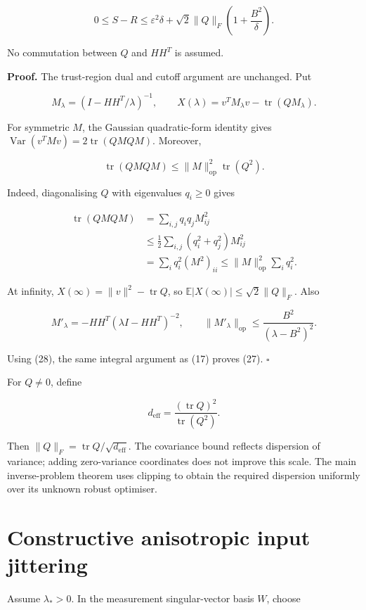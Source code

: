 \documentclass[11pt,a4paper]{article}
\begin{document}
\[
0\le S-R\le\varepsilon^2\delta+
\sqrt2\|Q\|_F\left(1+\frac{B^2}{\delta}\right).
\tag{27}
\]

No commutation between \(Q\) and \(HH^T\) is assumed.

\textbf{Proof.} The trust-region dual and cutoff argument are unchanged.
Put

\[
M_\lambda=(I-HH^T/\lambda)^{-1},\qquad
X(\lambda)=v^TM_\lambda v-\operatorname{tr}(QM_\lambda).
\]

For symmetric \(M\), the Gaussian quadratic-form identity gives
\(\operatorname{Var}(v^TMv)=2\operatorname{tr}(QMQM)\). Moreover,

\[
\operatorname{tr}(QMQM)\le\|M\|_{\mathrm{op}}^2\operatorname{tr}(Q^2).
\tag{28}
\]

Indeed, diagonalising \(Q\) with eigenvalues \(q_i\ge0\) gives

\[
\begin{aligned}
\operatorname{tr}(QMQM)
&=\sum_{i,j}q_iq_jM_{ij}^2\\
&\le\frac12\sum_{i,j}(q_i^2+q_j^2)M_{ij}^2\\
&=\sum_iq_i^2(M^2)_{ii}
\le\|M\|_{\mathrm{op}}^2\sum_iq_i^2.
\end{aligned}
\]

At infinity, \(X(\infty)=\|v\|^2-\operatorname{tr}Q\), so
\(\mathbb E|X(\infty)|\le\sqrt2\|Q\|_F\). Also

\[
M'_\lambda=-HH^T(\lambda I-HH^T)^{-2},\qquad
\|M'_\lambda\|_{\mathrm{op}}
\le\frac{B^2}{(\lambda-B^2)^2}.
\]

Using (28), the same integral argument as (17) proves (27). \(\square\)

For \(Q\ne0\), define

\[
d_{\mathrm{eff}}=\frac{(\operatorname{tr}Q)^2}{\operatorname{tr}(Q^2)}.
\]

Then \(\|Q\|_F=\operatorname{tr}Q/\sqrt{d_{\mathrm{eff}}}\). The
covariance bound reflects dispersion of variance; adding zero-variance
coordinates does not improve this scale. The main inverse-problem
theorem uses clipping to obtain the required dispersion uniformly over
its unknown robust optimiser.

\hypertarget{constructive-anisotropic-input-jittering}{%
\section{Constructive anisotropic input
jittering}\label{constructive-anisotropic-input-jittering}}

Assume \(\lambda_*>0\). In the measurement singular-vector basis \(W\),
choose
\end{document}
